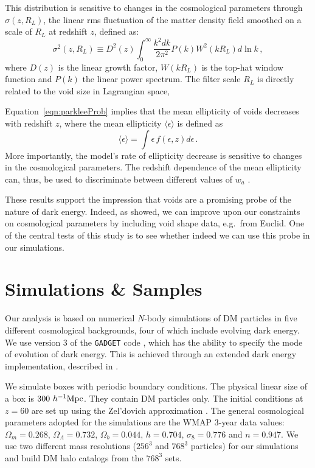 This distribution is sensitive to changes in the cosmological parameters \citep{parklee07} through $\sigma(z, R_L)$, the linear rms 
fluctuation of the matter density field smoothed on a scale of $R_L$ at redshift $z$, defined as:
\begin{equation}
\label{eqn:sigma_general}
\sigma^2(z, R_L) \equiv D^2(z)\int_0^\infty \frac{k^2 dk}{2\pi^2} P(k) W^2(kR_L) d\ln k \,,
\end{equation}
where $D(z)$ is the linear growth factor, $W(kR_L)$ is the top-hat window function and $P(k)$ the linear power 
spectrum. The filter scale $R_L$ is directly related to the void size in Lagrangian space, 

Equation~\ref{eqn:parkleeProb} implies that the mean ellipticity of voids decreases with redshift $z$, where the mean ellipticity 
$\langle\epsilon\rangle$ is defined as
\begin{equation}
	\langle\epsilon\rangle = \int \epsilon\, f(\epsilon,z) d\epsilon \,.
\end{equation}
More importantly, the model's rate of ellipticity decrease is sensitive to changes in the cosmological parameters. The redshift dependence 
of the mean ellipticity can, thus, be used to discriminate between different values of $w_a$ \citep{leepark09, lavaux10}. 

These results support the impression that voids are a promising probe of the nature of dark energy. Indeed, as \citet{biswas10} showed, 
we can improve upon our constraints on cosmological parameters by including void shape data, e.g.\ from Euclid.
One of the central tests of this study is to see whether indeed we can use this probe in our simulations.

\section{Simulations \& Samples}
\label{sec:data}
Our analysis is based on numerical $N$-body simulations of DM particles in five different cosmological backgrounds, four of which include evolving 
dark energy. We use version 3 of the \texttt{GADGET} code \citep{springel05}, which has the ability to specify the mode of evolution of 
dark energy. This is achieved through an extended dark energy implementation, described in \citet{dolag04}.

We simulate boxes with periodic boundary conditions. The physical linear size of a box is $300 ~h^{-1} {\rm Mpc}$. They contain DM particles only. 
The initial conditions at $z=60$ are set up using the Zel'dovich approximation \citep{zeldovich70}.
The general cosmological parameters adopted for the simulations are the WMAP 3-year data values: $\Omega_m = 0.268$, 
$\Omega_\Lambda = 0.732$, $\Omega_b = 0.044$, $h = 0.704$, $\sigma_8 = 0.776$ and $n = 0.947$. We use two different mass resolutions ($256^3$ 
and $768^3$ particles) for our simulations and build DM halo catalogs from the $768^3$ sets.

